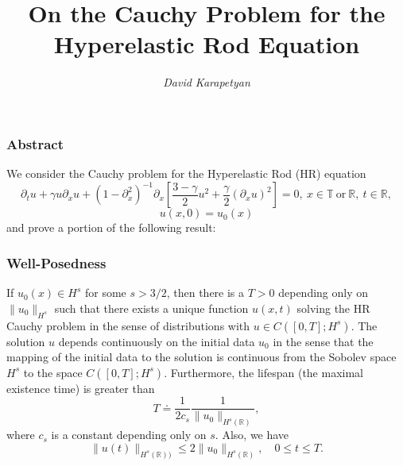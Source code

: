 \documentclass{beamer}
\date{}
\title{On the Cauchy Problem for the Hyperelastic Rod Equation}
\author{\it David Karapetyan}
\newcommand{\rr}{\mathbb{R}}
\newcommand{\p}{\partial}
\begin{document}
 \begin{frame}
	 \titlepage
 \end{frame}

 \begin{frame}
	 \frametitle{Abstract}
	 We consider the Cauchy problem for the Hyperelastic Rod (HR) equation
	 \begin{equation*} 
		 \label{hr}
		 \partial_t u + \gamma u\partial_x u + (1-\p_x^2)^{-1} \p_x \left
		 [\frac{3- \gamma}{2} u^2 + \frac{\gamma}{2}(\p_x u)^2 \right ] = 0,
		 \ x \in  \mathbb{T} \  \text{or}  \ \rr,  \ t \in \mathbb{R},
	 \end{equation*}
	 \begin{equation*} 
		 \label{hr-data} 
		 u(x, 0) = u_0 (x)
	 \end{equation*}
%
and prove a portion of the following result:
%
%
%
%
%
	\frametitle{Well-Posedness}
\end{frame}
\begin{frame}
\begin{theorem}
\label{hr-wp}
If $u_0(x) \in  H^s$ for some $s >3/2$,  then there is  a $T>0$
depending only on  $\|u_0\|_{H^s}$ such that there exists a unique
function $u(x, t)$ solving  the HR Cauchy problem
in the sense of distributions with  $u \in C([0, T]; H^s)$.
The solution $u$ depends continuously on the initial data $u_0$
in the sense that the mapping of the initial data to the solution 
is continuous from the Sobolev space $H^s$ to the space $C([0, T]; H^s)$.
Furthermore, the  lifespan (the maximal existence time)
 is greater than 
%
     \begin{equation*}
   T
   \doteq
   \frac{1}{2c_s}
   \frac{1}{ \|u_0 \|_{H^s(\rr)}},
 \end{equation*}
%
where $c_s$  is a constant depending only on $s$.
Also, we have 
%
  \begin{equation*}
   \label{u-u0-Hs-bound}
\|u(t)\|_{H^s(\rr))}
  \le
  2
  \|u_0 \|_{H^s(\rr)},
  \quad
  0\le t \le T.
   \end{equation*}
\end{theorem}
\end{frame}
%
%
%
\end{document}
